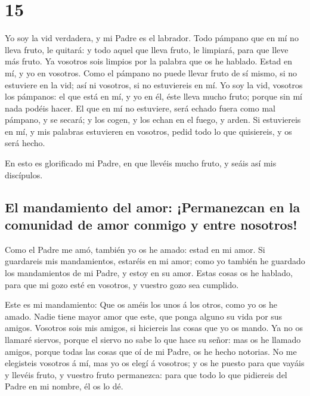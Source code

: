 \hypertarget{section-14}{%
\section{15}\label{section-14}}

 Yo soy la vid verdadera, y mi Padre es el labrador.
 Todo pámpano que en mí no lleva fruto, le quitará: y todo
aquel que lleva fruto, le limpiará, para que lleve más fruto.
 Ya vosotros sois limpios por la palabra que os he hablado.
 Estad en mí, y yo en vosotros. Como el pámpano no puede
llevar fruto de sí mismo, si no estuviere en la vid; así ni vosotros, si
no estuviereis en mí.  Yo soy la vid, vosotros los pámpanos:
el que está en mí, y yo en él, éste lleva mucho fruto; porque sin mí
nada podéis hacer.  El que en mí no estuviere, será echado
fuera como mal pámpano, y se secará; y los cogen, y los echan en el
fuego, y arden.  Si estuviereis en mí, y mis palabras
estuvieren en vosotros, pedid todo lo que quisiereis, y os será hecho.

 En esto es glorificado mi Padre, en que llevéis mucho
fruto, y seáis así mis discípulos.

\hypertarget{el-mandamiento-del-amor-permanezcan-en-la-comunidad-de-amor-conmigo-y-entre-nosotros}{%
\subsection{El mandamiento del amor: ¡Permanezcan en la comunidad de
amor conmigo y entre
nosotros!}\label{el-mandamiento-del-amor-permanezcan-en-la-comunidad-de-amor-conmigo-y-entre-nosotros}}

 Como el Padre me amó, también yo os he amado: estad en mi
amor.  Si guardareis mis mandamientos, estaréis en mi amor;
como yo también he guardado los mandamientos de mi Padre, y estoy en su
amor.  Estas cosas os he hablado, para que mi gozo esté en
vosotros, y vuestro gozo sea cumplido.

 Este es mi mandamiento: Que os améis los unos á los otros,
como yo os he amado.  Nadie tiene mayor amor que este, que
ponga alguno su vida por sus amigos.  Vosotros sois mis
amigos, si hiciereis las cosas que yo os mando.  Ya no os
llamaré siervos, porque el siervo no sabe lo que hace su señor: mas os
he llamado amigos, porque todas las cosas que oí de mi Padre, os he
hecho notorias.  No me elegisteis vosotros á mí, mas yo os
elegí á vosotros; y os he puesto para que vayáis y llevéis fruto, y
vuestro fruto permanezca: para que todo lo que pidiereis del Padre en mi
nombre, él os lo dé.

